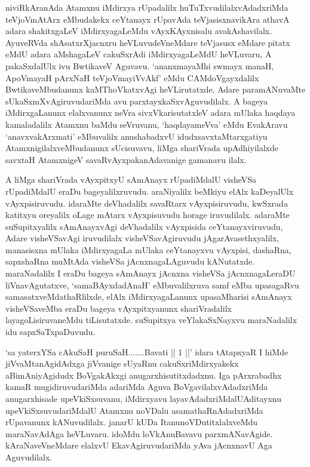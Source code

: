\begin{artha}
niviRkAranAda Atamxnu iMdirxya rUpadalilx huTuTxvudilalxvAdadx\-riMda teVjoVmAtArx eMbudakekx ceYtanayx rUpavAda teVjasisxnavikAra athavA adara shakitxgaLeV iMdirxyagaLeMdu vAyxKAyxnisalu avakAshavilalx. AyuveRVda shAsatxrXjacnxru heVLuvudeVneMdare teVjasusx eMdare pitatx eMdU adara aMshagaLeV cakuSxrAdi iMdirxyagaLeMdU heVLuvaru, A pakaSxdalUlx ivu BwtikaveV Aguvavu. `ananxmayaMhi swmayx manaH, ApoVmayaH pArxNaH teVjoVmayiVvAkf' eMdu CAMdoVgayxdalilx BwtikaveMbudanunx kaMThoVkatxvAgi heVLirutatxde. Adare paramANuvaMte sUkaSxmXvAgiruvudariMda avu parxtayxkaSxvAguvudilalx. A bageya iMdirxgaLanunx elalxvanunx neVra sivxVkarisutatxleV adara mUlaka haqdaya kamaladalilx Atamxnu baMdu seVruvanu, `haqdayameVva' eMdu EvakAravu `anavxvakArxmati' eMbuvalilx anushabadxvU idudx\break savxtaMtarxgatiyu AtamxnigilalxveMbudanunx sUcisuvavu, liMga shariVrada upAdhiyilalxde savxtaH AtamxnigeV savaRvAyxpakanAdavanige gamanavu ilalx. 
\end{artha}

\begin{artha}
A liMga shariVrada vAyxpitxyU sAmAnayx rUpadiMdalU visheVSa rUpadiMdalU eraDu bageyalilxruvudu. araNiyalilx beMkiyu elAlx kaDeyalUlx vAyxpisiruvudu. idaraMte deVhadalilx savaRtarx vAyxpisiruvudu, kwSxrada katitxyu oreyalilx oLage mAtarx vAyxpisuvudu horage iruvudilalx. adaraMte suSupitxyalilx sAmAnayxvAgi deVhadalilx vAyxpisida ceYtanayxviruvudu, Adare visheVSavAgi iruvudilalx visheVSavAgiruvudu jAgarAvasethxyalilx, manasisxna mUlaka iMdirxyagaLa mUlaka ceYtanayxvu vAyxpisi, dashaRna, sapxshaRna muMtAda visheVSa jAcnxnagaLAguvudu kANutatxde. maraNadalilx I eraDu bageya sAmAnayx jAcnxna visheVSa jAcnxnagaLeraDU liVnavAgutatxve, `samaBAyxdadAnaH' eMbuvalilxruva samf eMba upasagaRvu samasatx\-\break veMdathaRlilxde, elAlx iMdirxyagaLanunx upasaMharisi sAmAnayx visheVSaveMba eraDu bageya vAyxpitxyanunx shariVradalilx layagoLisiruvaneMdu tiLisutatxde. suSupitxya veYlakaSxNayxvu maraNadalilx idu sapxSaTxpaDuvudu. 
\end{artha}

\begin{artha}%
`sa yaterxYSa cAkuSaH puruSaH.......Bavati || 1 ||' idara tAtapxyaR I hiMde jiVvaMtanAgidAdxga jiVvanige sUyaRnu cakuSxriMdirxyakekx aBimAniyAgidudx BoVgakAkxgi anugarxhisutitxdadxnu. Iga pArxrabadhx kamaR mugidiruvudariMda adariMda Aguva BoVgavilalxvAdadxriMda anugarxhisade upeVkiSxsuvanu, iMdirxyavu layavAdadxriMdalU\break Aditayxnu upeVkiSxsuvudariMdalU Atamxnu noVDalu asamathaRnAdadxriMda rUpavanunx kANuvudilalx. janarU kUDa Itanu\break noVDutitxlalxveMdu maraNavAdAga heVLuvaru. idoMdu loVkAnu\-Bavavu parxmANavAgide. kAraNaveVneMdare elalxvU EkavAgiruvudariMda yAva jAcnxnavU Aga Aguvudilalx.
\end{artha}


